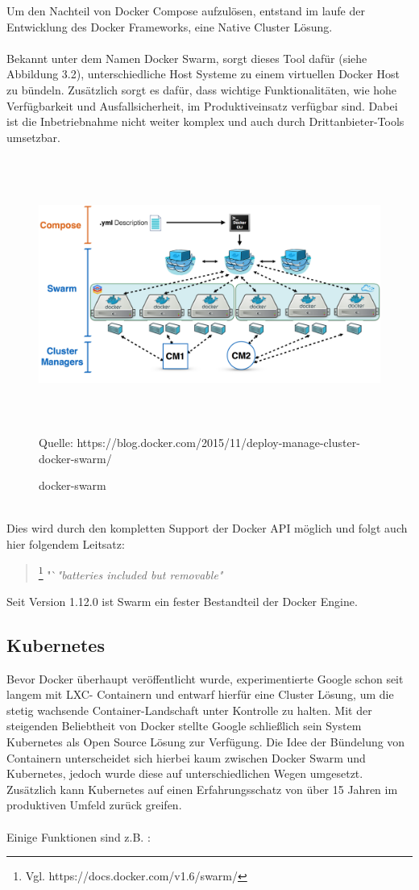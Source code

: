 \documentclass[12pt,toc=bib,toc=listof]{scrreprt}
\begin{document}
Um den Nachteil von Docker Compose aufzulösen, entstand im laufe der Entwicklung des Docker Frameworks, eine Native Cluster Lösung.\\
\\
Bekannt unter dem Namen Docker Swarm, sorgt dieses Tool dafür (siehe Abbildung 3.2), unterschiedliche Host Systeme zu einem virtuellen Docker Host zu bündeln.
Zusätzlich sorgt es dafür, dass wichtige Funktionalitäten, wie hohe Verfügbarkeit und Ausfallsicherheit, im Produktiveinsatz verfügbar sind.
Dabei ist die Inbetriebnahme nicht weiter komplex und auch durch Drittanbieter-Tools umsetzbar.
\begin{figure}[hb]
	\centering
	\caption{docker-swarm}
	\includegraphics[width=15cm, height=9cm, scale=0.3]{docker-swarm.png}
	Quelle: https://blog.docker.com/2015/11/deploy-manage-cluster-docker-swarm/
\end{figure}
\\
Dies wird durch den kompletten Support der Docker API möglich und folgt auch hier folgendem Leitsatz:

\begin{quote}
	\footnote[1]{Vgl. https://docs.docker.com/v1.6/swarm/}
	"`\textit{"batteries included but removable"}
\end{quote}
Seit Version 1.12.0 ist Swarm ein fester Bestandteil der Docker Engine.\cite{swarm}
\subsection{Kubernetes}
Bevor Docker überhaupt veröffentlicht wurde, experimentierte Google schon seit langem mit LXC- Containern und entwarf hierfür eine Cluster Lösung, um die stetig wachsende Container-Landschaft unter Kontrolle zu halten.
Mit der steigenden Beliebtheit von Docker stellte Google schließlich sein System Kubernetes als Open Source Lösung zur Verfügung.
Die Idee der Bündelung von Containern unterscheidet sich hierbei kaum zwischen Docker Swarm und Kubernetes, jedoch wurde diese auf unterschiedlichen Wegen umgesetzt.
Zusätzlich kann Kubernetes auf einen Erfahrungsschatz von über 15 Jahren im produktiven Umfeld zurück greifen.\\
\\
Einige Funktionen sind z.B. :
\end{document}
